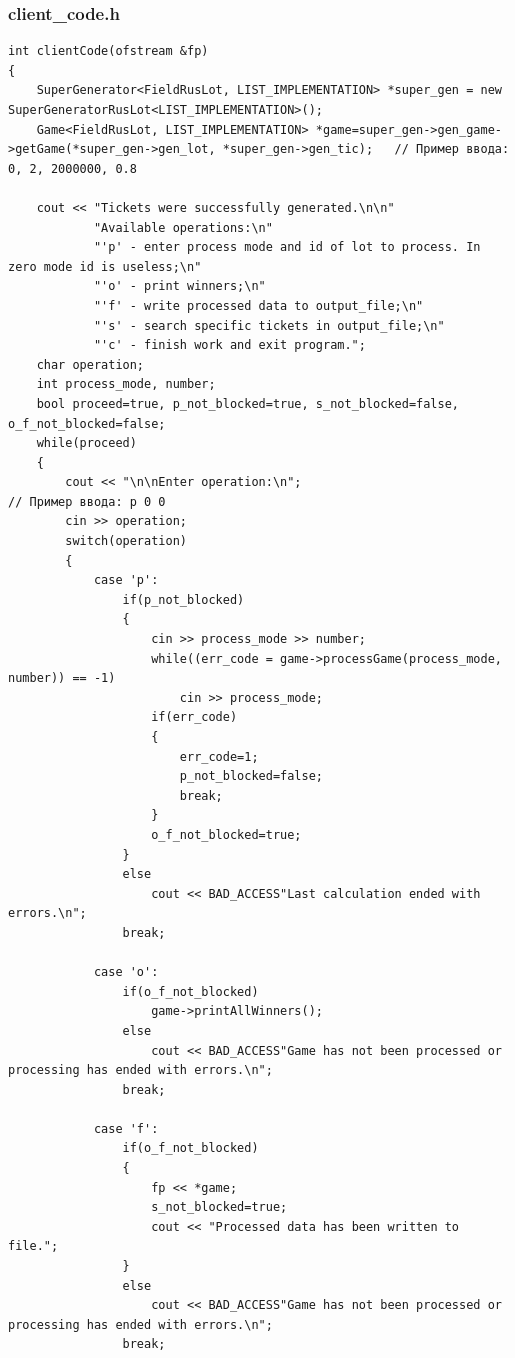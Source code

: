 \documentclass[a4paper,14pt]{article}
\begin{document}
\subsubsection{client\_code.h}
\begin{verbatim}
int clientCode(ofstream &fp)
{
    SuperGenerator<FieldRusLot, LIST_IMPLEMENTATION> *super_gen = new SuperGeneratorRusLot<LIST_IMPLEMENTATION>();
    Game<FieldRusLot, LIST_IMPLEMENTATION> *game=super_gen->gen_game->getGame(*super_gen->gen_lot, *super_gen->gen_tic);   // Пример ввода: 0, 2, 2000000, 0.8

    cout << "Tickets were successfully generated.\n\n"
            "Available operations:\n"
            "'p' - enter process mode and id of lot to process. In zero mode id is useless;\n"
            "'o' - print winners;\n"
            "'f' - write processed data to output_file;\n"
            "'s' - search specific tickets in output_file;\n"
            "'c' - finish work and exit program.";
    char operation;
    int process_mode, number;
    bool proceed=true, p_not_blocked=true, s_not_blocked=false, o_f_not_blocked=false;
    while(proceed)
    {
        cout << "\n\nEnter operation:\n";                               // Пример ввода: p 0 0
        cin >> operation;
        switch(operation)
        {
            case 'p':
                if(p_not_blocked)
                {
                    cin >> process_mode >> number;
                    while((err_code = game->processGame(process_mode, number)) == -1)
                        cin >> process_mode;
                    if(err_code)
                    {
                        err_code=1;
                        p_not_blocked=false;
                        break;
                    }
                    o_f_not_blocked=true;
                }
                else
                    cout << BAD_ACCESS"Last calculation ended with errors.\n";
                break;

            case 'o':
                if(o_f_not_blocked)
                    game->printAllWinners();
                else
                    cout << BAD_ACCESS"Game has not been processed or processing has ended with errors.\n";
                break;

            case 'f':
                if(o_f_not_blocked)
                {
                    fp << *game;
                    s_not_blocked=true;
                    cout << "Processed data has been written to file.";
                }
                else
                    cout << BAD_ACCESS"Game has not been processed or processing has ended with errors.\n";
                break;


\end{verbatim}
\end{document}
